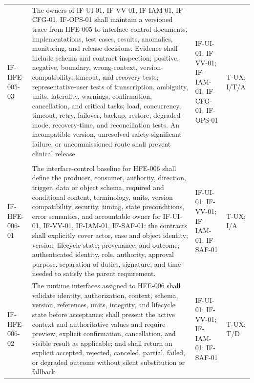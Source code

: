 \documentclass[11pt,letterpaper]{article}
\begin{document}
\begin{scriptsize}
\begin{longtable}{@{}L{0.14\textwidth}L{0.49\textwidth}L{0.19\textwidth}L{0.10\textwidth}@{}}
\addlinespace[2pt]
\mbox{IF-HFE-005-03} & The owners of IF-UI-01, IF-VV-01, IF-IAM-01, IF-CFG-01, IF-OPS-01 shall maintain a versioned trace from HFE-005 to interface-control documents, implementations, test cases, results, anomalies, monitoring, and release decisions. Evidence shall include schema and contract inspection; positive, negative, boundary, wrong-context, version-compatibility, timeout, and recovery tests; representative-user tests of transcription, ambiguity, units, laterality, warnings, confirmation, cancellation, and critical tasks; load, concurrency, timeout, retry, failover, backup, restore, degraded-mode, recovery-time, and reconciliation tests. An incompatible version, unresolved safety-significant failure, or uncommissioned route shall prevent clinical release. & IF-UI-01; IF-VV-01; IF-IAM-01; IF-CFG-01; IF-OPS-01 & T-UX; I\slash\allowbreak{}T\slash\allowbreak{}A \\
\addlinespace[2pt]
 \\
\addlinespace[2pt]
\mbox{IF-HFE-006-01} & The interface-control baseline for HFE-006 shall define the producer, consumer, authority, direction, trigger, data or object schema, required and conditional content, terminology, units, version compatibility, security, timing, state preconditions, error semantics, and accountable owner for IF-UI-01, IF-VV-01, IF-IAM-01, IF-SAF-01; the contracts shall explicitly cover actor, case and object identity; version; lifecycle state; provenance; and outcome; authenticated identity, role, authority, approval purpose, separation of duties, signature, and time needed to satisfy the parent requirement. & IF-UI-01; IF-VV-01; IF-IAM-01; IF-SAF-01 & T-UX; I\slash\allowbreak{}A \\
\addlinespace[2pt]
\mbox{IF-HFE-006-02} & The runtime interfaces assigned to HFE-006 shall validate identity, authorization, context, schema, version, references, units, integrity, and lifecycle state before acceptance; shall present the active context and authoritative values and require preview, explicit confirmation, cancellation, and visible result as applicable; and shall return an explicit accepted, rejected, canceled, partial, failed, or degraded outcome without silent substitution or fallback. & IF-UI-01; IF-VV-01; IF-IAM-01; IF-SAF-01 & T-UX; T\slash\allowbreak{}D \\

\end{longtable}
\end{scriptsize}
\end{document}
